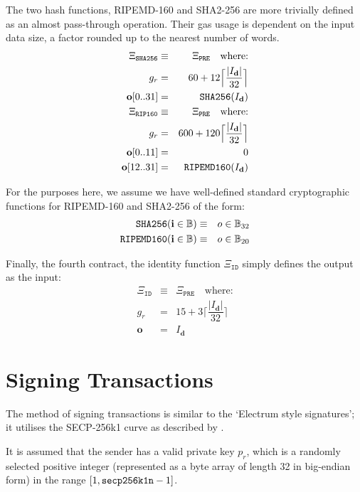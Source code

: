 \documentclass[9pt,oneside]{amsart}
\begin{document}
The two hash functions, RIPEMD-160 and SHA2-256 are more trivially defined as an almost pass-through operation. Their gas usage is dependent on the input data size, a factor rounded up to the nearest number of words.
\begin{eqnarray}
\Xi_{\mathtt{SHA256}} &\equiv& \Xi_{\mathtt{PRE}} \quad \text{where:} \\
g_r &=& 60 + 12\Big\lceil \dfrac{|I_\mathbf{d}|}{32} \Big\rceil\\
\mathbf{o}[0..31] &=& \mathtt{\tiny SHA256}(I_\mathbf{d})\\
\Xi_{\mathtt{RIP160}} &\equiv& \Xi_{\mathtt{PRE}} \quad \text{where:} \\
g_r &=& 600 + 120\Big\lceil \dfrac{|I_\mathbf{d}|}{32} \Big\rceil\\
\mathbf{o}[0..11] &=& 0 \\
\mathbf{o}[12..31] &=& \mathtt{\tiny RIPEMD160}(I_\mathbf{d})\\
\end{eqnarray}

For the purposes here, we assume we have well-defined standard cryptographic functions for RIPEMD-160 and SHA2-256 of the form:
\begin{eqnarray}
\mathtt{\small SHA256}(\mathbf{i} \in \mathbb{B}) & \equiv & o \in \mathbb{B}_{32} \\
\mathtt{\small RIPEMD160}(\mathbf{i} \in \mathbb{B}) & \equiv & o \in \mathbb{B}_{20}
\end{eqnarray}

Finally, the fourth contract, the identity function $\Xi_{\mathtt{ID}}$ simply defines the output as the input:
\begin{eqnarray}
\Xi_{\mathtt{ID}} &\equiv& \Xi_{\mathtt{PRE}} \quad \text{where:} \\
g_r &=& 15 + 3\Big\lceil \dfrac{|I_\mathbf{d}|}{32} \Big\rceil\\
\mathbf{o} &=& I_\mathbf{d}
\end{eqnarray}


\section{Signing Transactions}\label{app:signing}

The method of signing transactions is similar to the `Electrum style signatures'; it utilises the SECP-256k1 curve as described by \cite{gura2004comparing}.

It is assumed that the sender has a valid private key $p_r$, which is a randomly selected positive integer (represented as a byte array of length 32 in big-endian form) in the range \hbox{$[1, \mathtt{\tiny secp256k1n} - 1]$}.
\end{document}
